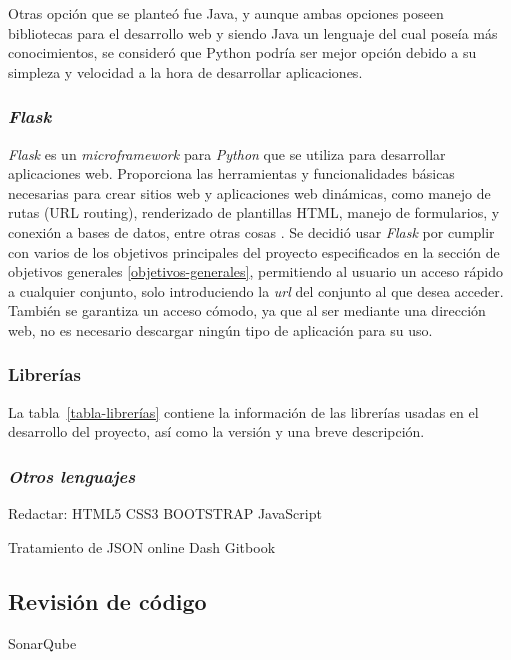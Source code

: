 Otras opción que se planteó fue Java, y aunque ambas opciones poseen bibliotecas para el desarrollo web y siendo Java un lenguaje del cual poseía más conocimientos, se consideró que Python podría ser mejor opción debido a su simpleza y velocidad a la hora de desarrollar aplicaciones.

\subsubsection{\textit{Flask}}\label{flask}
\textit{Flask} es un \textit{microframework} para \textit{Python} que se utiliza para desarrollar aplicaciones web. Proporciona las herramientas y funcionalidades básicas necesarias para crear sitios web y aplicaciones web dinámicas, como manejo de rutas (URL routing), renderizado de plantillas HTML, manejo de formularios, y conexión a bases de datos, entre otras cosas \cite{FlaskSite}. 
Se decidió usar \textit{Flask} por cumplir con varios de los objetivos principales del proyecto especificados en la sección de objetivos generales \ref{objetivos-generales}, permitiendo al usuario un acceso rápido a cualquier conjunto, solo introduciendo la \textit{url} del conjunto al que desea acceder. También se garantiza un acceso cómodo, ya que al ser mediante una dirección web, no es necesario descargar ningún tipo de aplicación para su uso.

\subsubsection{Librerías}
La tabla~\ref{tabla-librerías} contiene la información de las librerías usadas en el desarrollo del proyecto, así como la versión y una breve descripción.
\begin{table}
	\caption{Diccionario de Datos - Tabla Registros.}
    \label{tabla-librerías}
\end{table}


\subsubsection{\textit{Otros lenguajes}}
Redactar:
HTML5 
CSS3 
BOOTSTRAP 
JavaScript 




Tratamiento de JSON online
Dash
Gitbook

\subsection{Revisión de código}
SonarQube